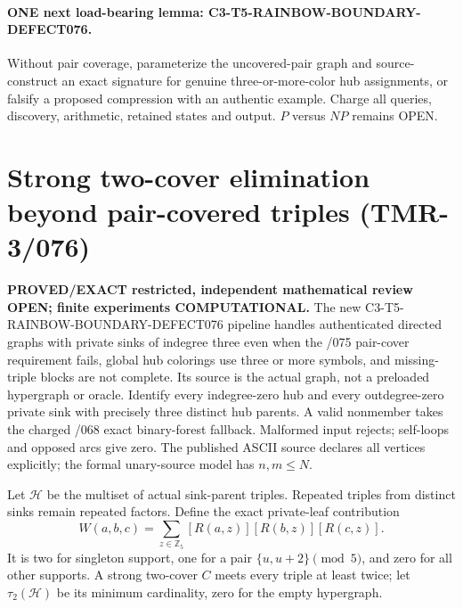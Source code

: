\documentclass[11pt]{article}
\begin{document}
\paragraph{ONE next load-bearing lemma:
C3-T5-RAINBOW-BOUNDARY-DEFECT076.}
Without pair coverage, parameterize the uncovered-pair
graph and source-construct an exact signature for genuine
three-or-more-color hub assignments, or falsify a proposed
compression with an authentic example. Charge all queries,
discovery, arithmetic, retained states and output.
$P$ versus $NP$ remains OPEN.


\section{Strong two-cover elimination beyond pair-covered triples (TMR-3/076)}
\noindent\textbf{PROVED/EXACT restricted, independent mathematical review OPEN;
finite experiments COMPUTATIONAL.}
The new \textsf{C3-T5-RAINBOW-BOUNDARY-DEFECT076}
pipeline handles authenticated directed graphs with private sinks of indegree
three even when the /075 pair-cover requirement fails, global hub colorings
use three or more symbols, and missing-triple blocks are not complete.
Its source is the actual graph, not a preloaded hypergraph or oracle.
Identify every indegree-zero hub and every outdegree-zero private
sink with precisely three distinct hub parents. A valid
nonmember takes the charged /068 exact binary-forest fallback.
Malformed input rejects; self-loops and opposed arcs give zero.
The published ASCII source declares all vertices explicitly;
the formal unary-source model has $n,m\le N$.

Let $\mathcal H$ be the multiset of actual sink-parent triples.
Repeated triples from distinct sinks remain repeated factors.
Define the exact private-leaf contribution
\[
 W(a,b,c)=\sum_{z\in\mathbb Z_5}
       [R(a,z)][R(b,z)][R(c,z)].
\]
It is two for singleton support, one for a pair
$\{u,u+2\}\pmod5$, and zero for all other supports.
A strong two-cover $C$ meets every triple at least twice;
let $\tau_2(\mathcal H)$ be its minimum cardinality, zero for
the empty hypergraph.
\end{document}
